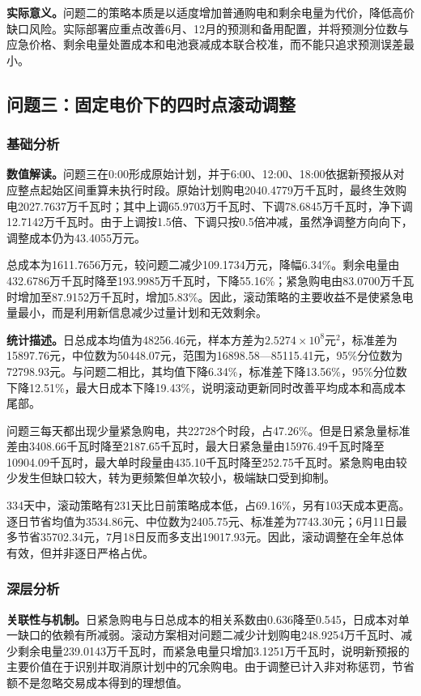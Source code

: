 \documentclass[UTF8,a4paper,12pt,fontset=fandol]{ctexart}
\numberwithin{equation}{section}
\begin{document}
\textbf{实际意义。}问题二的策略本质是以适度增加普通购电和剩余电量为代价，降低高价缺口风险。实际部署应重点改善6月、12月的预测和备用配置，并将预测分位数与应急价格、剩余电量处置成本和电池衰减成本联合校准，而不能只追求预测误差最小。

\subsection{问题三：固定电价下的四时点滚动调整}

\subsubsection{基础分析}

\textbf{数值解读。}问题三在0:00形成原始计划，并于6:00、12:00、18:00依据新预报从对应整点起始区间重算未执行时段。原始计划购电2040.4779万千瓦时，最终生效购电2027.7637万千瓦时；其中上调65.9703万千瓦时、下调78.6845万千瓦时，净下调12.7142万千瓦时。由于上调按1.5倍、下调只按0.5倍冲减，虽然净调整方向向下，调整成本仍为43.4055万元。

总成本为1611.7656万元，较问题二减少109.1734万元，降幅6.34\%。剩余电量由432.6786万千瓦时降至193.9985万千瓦时，下降55.16\%；紧急购电由83.0700万千瓦时增加至87.9152万千瓦时，增加5.83\%。因此，滚动策略的主要收益不是使紧急电量最小，而是利用新信息减少过量计划和无效剩余。

\textbf{统计描述。}日总成本均值为48256.46元，样本方差为$2.5274\times10^8$元$^2$，标准差为15897.76元，中位数为50448.07元，范围为16898.58---85115.41元，95\%分位数为72798.93元。与问题二相比，其均值下降6.34\%，标准差下降13.56\%，95\%分位数下降12.51\%，最大日成本下降19.43\%，说明滚动更新同时改善平均成本和高成本尾部。

问题三每天都出现少量紧急购电，共22728个时段，占47.26\%。但是日紧急量标准差由3408.66千瓦时降至2187.65千瓦时，最大日紧急量由15976.49千瓦时降至10904.09千瓦时，最大单时段量由435.10千瓦时降至252.75千瓦时。紧急购电由较少发生但缺口较大，转为更频繁但单次较小，极端缺口受到抑制。

334天中，滚动策略有231天比日前策略成本低，占69.16\%，另有103天成本更高。逐日节省均值为3534.86元、中位数为2405.75元、标准差为7743.30元；6月11日最多节省35702.34元，7月18日反而多支出19017.93元。因此，滚动调整在全年总体有效，但并非逐日严格占优。

\subsubsection{深层分析}

\textbf{关联性与机制。}日紧急购电与日总成本的相关系数由0.636降至0.545，日成本对单一缺口的依赖有所减弱。滚动方案相对问题二减少计划购电248.9254万千瓦时、减少剩余电量239.0143万千瓦时，而紧急电量只增加3.1251万千瓦时，说明新预报的主要价值在于识别并取消原计划中的冗余购电。由于调整已计入非对称惩罚，节省额不是忽略交易成本得到的理想值。
\end{document}
